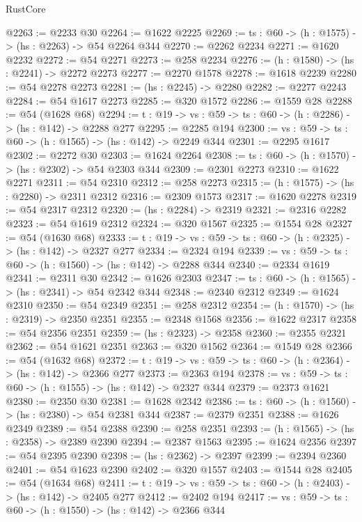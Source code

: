 \begin{lexlean}{RustCore}
\begin{coremodule}
@2263 := @2233 @30
@2264 := @1622 @2225
@2269 := {ts : @60} -> (h : @1575) -> (hs : @2263) -> @54 @2264 @344
@2270 := @2262 @2234
@2271 := @1620 @2232
@2272 := @54 @2271
@2273 := @258 @2234
@2276 := (h : @1580) -> (hs : @2241) -> @2272 @2273
@2277 := @2270 @1578
@2278 := @1618 @2239
@2280 := @54 @2278 @2273
@2281 := (hs : @2245) -> @2280
@2282 := @2277 @2243
@2284 := @54 @1617 @2273
@2285 := @320 @1572
@2286 := @1559 @28
@2288 := @54 (@1628 @68)
@2294 := {t : @19} -> {vs : @59} -> {ts : @60} -> (h : @2286) -> (hs : @142) -> @2288 @277
@2295 := @2285 @194
@2300 := {vs : @59} -> {ts : @60} -> (h : @1565) -> (hs : @142) -> @2249 @344
@2301 := @2295 @1617
@2302 := @2272 @30
@2303 := @1624 @2264
@2308 := {ts : @60} -> (h : @1570) -> (hs : @2302) -> @54 @2303 @344
@2309 := @2301 @2273
@2310 := @1622 @2271
@2311 := @54 @2310
@2312 := @258 @2273
@2315 := (h : @1575) -> (hs : @2280) -> @2311 @2312
@2316 := @2309 @1573
@2317 := @1620 @2278
@2319 := @54 @2317 @2312
@2320 := (hs : @2284) -> @2319
@2321 := @2316 @2282
@2323 := @54 @1619 @2312
@2324 := @320 @1567
@2325 := @1554 @28
@2327 := @54 (@1630 @68)
@2333 := {t : @19} -> {vs : @59} -> {ts : @60} -> (h : @2325) -> (hs : @142) -> @2327 @277
@2334 := @2324 @194
@2339 := {vs : @59} -> {ts : @60} -> (h : @1560) -> (hs : @142) -> @2288 @344
@2340 := @2334 @1619
@2341 := @2311 @30
@2342 := @1626 @2303
@2347 := {ts : @60} -> (h : @1565) -> (hs : @2341) -> @54 @2342 @344
@2348 := @2340 @2312
@2349 := @1624 @2310
@2350 := @54 @2349
@2351 := @258 @2312
@2354 := (h : @1570) -> (hs : @2319) -> @2350 @2351
@2355 := @2348 @1568
@2356 := @1622 @2317
@2358 := @54 @2356 @2351
@2359 := (hs : @2323) -> @2358
@2360 := @2355 @2321
@2362 := @54 @1621 @2351
@2363 := @320 @1562
@2364 := @1549 @28
@2366 := @54 (@1632 @68)
@2372 := {t : @19} -> {vs : @59} -> {ts : @60} -> (h : @2364) -> (hs : @142) -> @2366 @277
@2373 := @2363 @194
@2378 := {vs : @59} -> {ts : @60} -> (h : @1555) -> (hs : @142) -> @2327 @344
@2379 := @2373 @1621
@2380 := @2350 @30
@2381 := @1628 @2342
@2386 := {ts : @60} -> (h : @1560) -> (hs : @2380) -> @54 @2381 @344
@2387 := @2379 @2351
@2388 := @1626 @2349
@2389 := @54 @2388
@2390 := @258 @2351
@2393 := (h : @1565) -> (hs : @2358) -> @2389 @2390
@2394 := @2387 @1563
@2395 := @1624 @2356
@2397 := @54 @2395 @2390
@2398 := (hs : @2362) -> @2397
@2399 := @2394 @2360
@2401 := @54 @1623 @2390
@2402 := @320 @1557
@2403 := @1544 @28
@2405 := @54 (@1634 @68)
@2411 := {t : @19} -> {vs : @59} -> {ts : @60} -> (h : @2403) -> (hs : @142) -> @2405 @277
@2412 := @2402 @194
@2417 := {vs : @59} -> {ts : @60} -> (h : @1550) -> (hs : @142) -> @2366 @344

\end{coremodule}
\end{lexlean}
